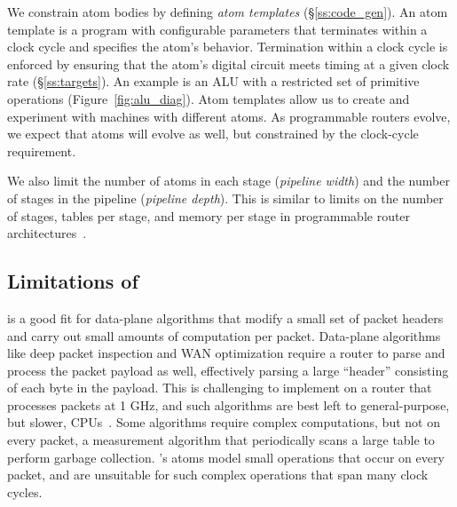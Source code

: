 We constrain atom bodies by defining {\it atom templates}
(\S\ref{ss:code_gen}).  An atom template is a program with configurable
parameters that terminates within a clock cycle and specifies the atom's
behavior.  Termination within a clock cycle is enforced by ensuring that the
atom's digital circuit meets timing at a given clock rate (\S\ref{ss:targets}).
An example is an ALU with a restricted set of primitive operations
(Figure~\ref{fig:alu_diag}). Atom templates allow us to create and experiment
with \absmachine machines with different atoms. As programmable routers evolve,
we expect that atoms will evolve as well, but constrained by the clock-cycle
requirement.

 We also limit the number of atoms in each stage
(\textit{pipeline width}) and the number of stages in the pipeline
(\textit{pipeline depth}). This is similar to limits on the number of stages,
tables per stage, and memory per stage in programmable router
architectures~\cite{lavanya_compiler, rmt}.

\subsection{Limitations of \absmachine}
\label{domino_ss:limitations}

\absmachine is a good fit for data-plane algorithms that modify a small set of
packet headers and carry out small amounts of computation per packet.
Data-plane algorithms like deep packet inspection and WAN optimization require
a router to parse and process the packet payload as well, effectively parsing a
large ``header'' consisting of each byte in the payload. This is challenging to
implement on a router that processes packets at 1 GHz, and such algorithms are best left to
general-purpose, but slower, CPUs~\cite{e2}.  Some
algorithms require complex computations, but not on every packet, \eg a
measurement algorithm that periodically scans a large table to perform garbage
collection.  \absmachine's atoms model small operations that occur on every
packet, and are unsuitable for such complex operations that span many clock
cycles.
